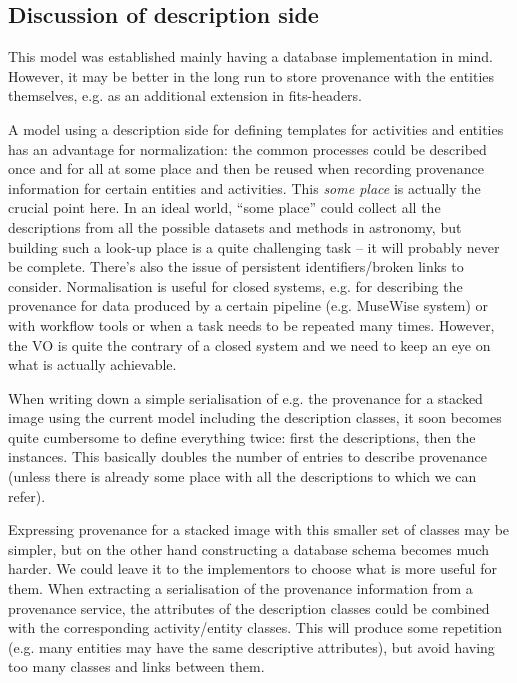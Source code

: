 
\subsection{Discussion of description side}
This model was established mainly having a database implementation in mind. 
However, it may be better in the long run to store provenance with 
the entities themselves, e.g. as an additional extension in fits-headers.

A model using a description side for defining templates for activities and
entities has an advantage for normalization: the common processes could be 
described once and for all at some place and then be reused when recording
provenance information for certain entities and activities. This \emph{some place} 
is actually the crucial point here.
In an ideal world, ``some place'' could collect all the descriptions from all 
the possible datasets and methods in astronomy, but building such a look-up place 
is a quite challenging task -- it will probably never be complete. There's also 
the issue of persistent identifiers/broken links to consider.
Normalisation is useful for closed systems, e.g. for describing the provenance 
for data produced by a certain pipeline (e.g. MuseWise system) or with 
workflow tools or when a task needs to be repeated many times. However, the VO 
is quite the contrary of a closed system and we need to keep an eye on what is 
actually achievable.

When writing down a simple serialisation of e.g. the provenance for a stacked 
image using the current model including the description classes, it soon becomes quite cumbersome to define 
everything twice: first the descriptions, then the instances. This basically 
doubles the number of entries to describe provenance (unless there is already 
some place with all the descriptions to which we can refer).

Expressing provenance for a stacked image with this smaller set of classes may 
be simpler, but on the other hand constructing a database schema becomes much 
harder. 
We could leave it to the implementors to choose what is more useful for them.
When extracting a serialisation of the provenance information from a provenance 
service, the attributes of the description classes could be combined with 
the corresponding activity/entity classes. This will produce some repetition
(e.g. many entities may have the same descriptive attributes), but 
avoid having too many classes and links between them.

